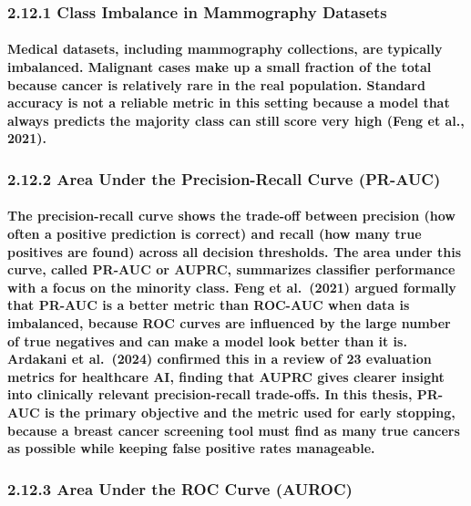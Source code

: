 \subsubsection{2.12.1 Class Imbalance in Mammography
Datasets}\label{class-imbalance-in-mammography-datasets}

\paragraph{Medical datasets, including mammography collections, are typically imbalanced. Malignant cases make up a small fraction of the total because cancer is relatively rare in the real population. Standard accuracy is not a reliable metric in this setting because a model that always predicts the majority class can still score very high (Feng et al., 2021).}

\subsubsection{2.12.2 Area Under the Precision-Recall Curve
(PR-AUC)}\label{area-under-the-precision-recall-curve-pr-auc}

\paragraph{The precision-recall curve shows the trade-off between precision (how often a positive prediction is correct) and recall (how many true positives are found) across all decision thresholds. The area under this curve, called PR-AUC or AUPRC, summarizes classifier performance with a focus on the minority class. Feng et al. (2021) argued formally that PR-AUC is a better metric than ROC-AUC when data is imbalanced, because ROC curves are influenced by the large number of true negatives and can make a model look better than it is. Ardakani et al. (2024) confirmed this in a review of 23 evaluation metrics for healthcare AI, finding that AUPRC gives clearer insight into clinically relevant precision-recall trade-offs. In this thesis, PR-AUC is the primary objective and the metric used for early stopping, because a breast cancer screening tool must find as many true cancers as possible while keeping false positive rates manageable.}

\subsubsection{2.12.3 Area Under the ROC Curve
(AUROC)}\label{area-under-the-roc-curve-auroc}

